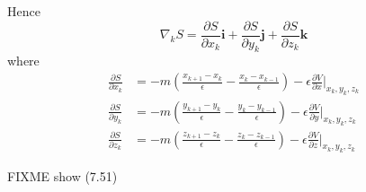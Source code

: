 Hence
\begin{equation*}
\nabla_kS
=\frac{\partial S}{\partial x_k}\mathbf i
+\frac{\partial S}{\partial y_k}\mathbf j
+\frac{\partial S}{\partial z_k}\mathbf k
\end{equation*}
where
\begin{align*}
\frac{\partial S}{\partial x_k}
&=-m\left(\frac{x_{k+1}-x_k}{\epsilon}-\frac{x_k-x_{k-1}}{\epsilon}\right)
-\epsilon\frac{\partial V}{\partial x}\bigg|_{x_k,y_k,z_k}
\\
\frac{\partial S}{\partial y_k}
&=-m\left(\frac{y_{k+1}-y_k}{\epsilon}-\frac{y_k-y_{k-1}}{\epsilon}\right)
-\epsilon\frac{\partial V}{\partial y}\bigg|_{x_k,y_k,z_k}
\\
\frac{\partial S}{\partial z_k}
&=-m\left(\frac{z_{k+1}-z_k}{\epsilon}-\frac{z_k-z_{k-1}}{\epsilon}\right)
-\epsilon\frac{\partial V}{\partial z}\bigg|_{x_k,y_k,z_k}
\end{align*}

FIXME show (7.51)



